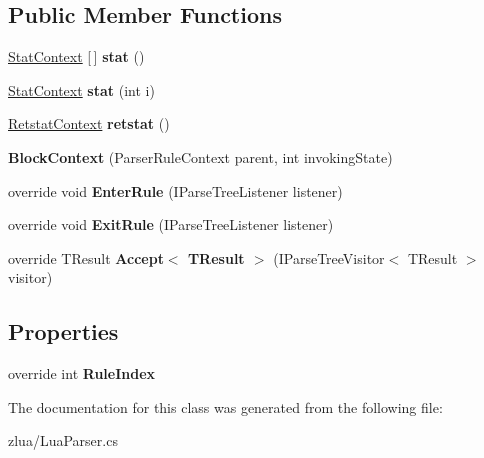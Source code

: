 \subsection*{Public Member Functions}
\begin{DoxyCompactItemize}
\item 
\mbox{\label{classzlua_1_1_lua_parser_1_1_block_context_aefd87c6d742b9aedaeceaa3d49f17673}} 
\mbox{\hyperlink{classzlua_1_1_lua_parser_1_1_stat_context}{Stat\+Context}} \mbox{[}$\,$\mbox{]} {\bfseries stat} ()
\item 
\mbox{\label{classzlua_1_1_lua_parser_1_1_block_context_a0c16e57fce5f61276d143739201f9c28}} 
\mbox{\hyperlink{classzlua_1_1_lua_parser_1_1_stat_context}{Stat\+Context}} {\bfseries stat} (int i)
\item 
\mbox{\label{classzlua_1_1_lua_parser_1_1_block_context_a7af7d7d934d9a9845758a61f203b63be}} 
\mbox{\hyperlink{classzlua_1_1_lua_parser_1_1_retstat_context}{Retstat\+Context}} {\bfseries retstat} ()
\item 
\mbox{\label{classzlua_1_1_lua_parser_1_1_block_context_a460bade37efd71da8f467a0ac7ef9978}} 
{\bfseries Block\+Context} (Parser\+Rule\+Context parent, int invoking\+State)
\item 
\mbox{\label{classzlua_1_1_lua_parser_1_1_block_context_a731bf8c6436a169c9803bc79d2030c55}} 
override void {\bfseries Enter\+Rule} (I\+Parse\+Tree\+Listener listener)
\item 
\mbox{\label{classzlua_1_1_lua_parser_1_1_block_context_a9fd81c784c7bf1fdb7a8f4603f02ad9d}} 
override void {\bfseries Exit\+Rule} (I\+Parse\+Tree\+Listener listener)
\item 
\mbox{\label{classzlua_1_1_lua_parser_1_1_block_context_a7bf3107ac797c02041d83083172c98b9}} 
override T\+Result {\bfseries Accept$<$ T\+Result $>$} (I\+Parse\+Tree\+Visitor$<$ T\+Result $>$ visitor)
\end{DoxyCompactItemize}
\subsection*{Properties}
\begin{DoxyCompactItemize}
\item 
\mbox{\label{classzlua_1_1_lua_parser_1_1_block_context_af3ae65d5ad2faf57315e634e9e4d1fd8}} 
override int {\bfseries Rule\+Index}
\end{DoxyCompactItemize}


The documentation for this class was generated from the following file\+:\begin{DoxyCompactItemize}
\item 
zlua/Lua\+Parser.\+cs\end{DoxyCompactItemize}
